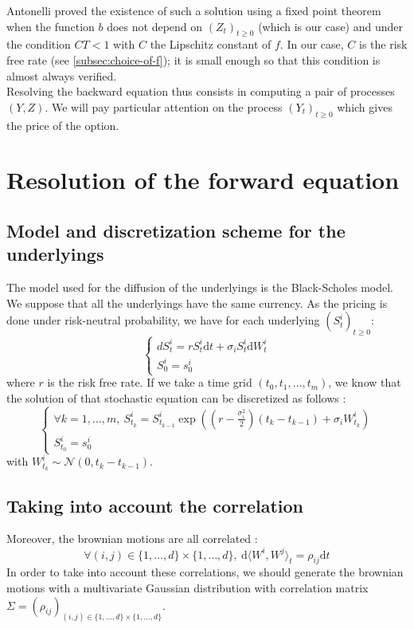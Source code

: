 \documentclass[a4paper,11pt,english]{book}
\begin{document}
Antonelli \cite{antonelli1993backward} proved the existence of such a solution using a fixed point theorem when the function $b$ does not depend on $(Z_{t})_{t\geq0}$ (which is our case) and under the condition $CT<1$ with $C$ the Lipschitz constant of $f$. In our case, $C$ is the risk free rate (see \ref{subsec:choice-of-f}); it is small enough so that this condition is almost always verified.\\

Resolving the backward equation thus consists in computing a pair of processes $(Y,Z)$. We will pay particular attention on the process $(Y_{t})_{t\geq0}$ which gives the price of the option.

\section{Resolution of the forward equation}
\subsection{Model and discretization scheme for the underlyings}
\label{subsec:underlying-discretization}
The model used for the diffusion of the underlyings is the Black-Scholes model. We suppose that all the underlyings have the same currency. As the pricing is done under risk-neutral probability, we have for each underlying $(S^{i}_{t})_{t\geq0}$:
$$
\begin{cases}
dS_{t}^{i}=r S_{t}^{i} \text{d}t+\sigma_{i} S_{t}^{i} \text{d}W_{t}^{i} \\
S_{0}^{i}=s_{0}^{i} 
\end{cases}
$$
where $r$ is the risk free rate.
If we take a time grid $(t_{0},t_{1},\ldots,t_{m})$, we know that the solution of that stochastic equation can be discretized as follows :
$$\begin{cases}
\forall k=1,\ldots,m,~ S_{t_{k}}^{i}=S_{t_{k-1}}^{i}\exp\left((r-\frac{\sigma_{i}^{2}}{2})(t_{k}-t_{k-1})+\sigma_{i}W_{t_{k}}^{i}\right)\\
S_{t_{0}}^{i}=s_{0}^{i} 
\end{cases}
$$
with $W_{t_{k}}^{i} \sim \mathcal{N}(0,t_{k}-t_{k-1})$.\\

\subsection{Taking into account the correlation}
Moreover, the brownian motions are all correlated : $$\forall (i,j) \in \{1,\ldots,d\}\times\{1,\ldots,d\},~ \text{d}\langle W^{i},W^{j}\rangle_t=\rho_{ij}\text{d}t$$
In order to take into account these correlations, we should generate the brownian motions with a multivariate Gaussian distribution with correlation matrix $\Sigma=(\rho_{ij})_{(i,j) \in \{1,\ldots,d\}\times\{1,\ldots,d\}}$.\\
\end{document}
